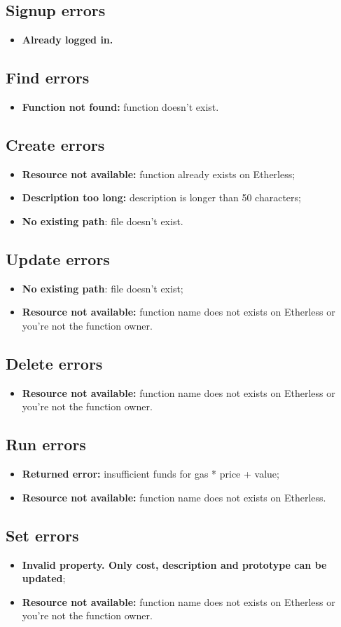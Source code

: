 \subsection{Signup errors}
\begin{itemize}
	\item \textbf{Already logged in.}
\end{itemize}
\subsection{Find errors}
\begin{itemize}
	\item \textbf{Function not found:} function doesn't exist.
\end{itemize}
\subsection{Create errors}
\begin{itemize}
	\item \textbf{Resource not available:} function already exists on Etherless;
	\item \textbf{Description too long:} description is longer than 50 characters;
	\item \textbf{No existing path}: file doesn't exist.
\end{itemize}
\subsection{Update errors}
\begin{itemize}
	\item \textbf{No existing path}: file doesn't exist;
	\item \textbf{Resource not available:} function name does not exists on Etherless or you're not the function owner.
\end{itemize}
\subsection{Delete errors}
\begin{itemize}
 	\item \textbf{Resource not available:} function name does not exists on Etherless or you're not the function owner.
\end{itemize}
\subsection{Run errors}
\begin{itemize}
	\item \textbf{Returned error: }insufficient funds for gas * price + value;
	\item \textbf{Resource not available:} function name does not exists on Etherless.
\end{itemize}
\subsection{Set errors}
\begin{itemize}
	\item \textbf{Invalid property. Only cost, description and prototype can be updated};
	\item \textbf{Resource not available:} function name does not exists on Etherless or you're not the function owner.
\end{itemize}


